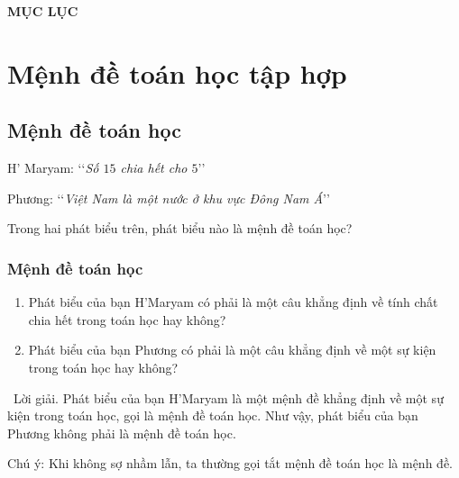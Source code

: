 \documentclass[Main.tex]{subfiles}
\renewcommand{\loigiai}[1]{%
	\par\noindent%
	{\color{dndo}\reflectbox{\Large\WritingHand}\ {\fmmfamily\LARGE Lời giải.}} #1
}
\begin{document}
	\newcommand{\nhanmanh}[2][darkmidnightblue]{{\large\color{#1}\textit{#2}}}
	\setcounter{tocdepth}{1}
	\setcounter{secnumdepth}{3}
	\begin{center}
		\begin{tcolorbox}[enhanced,hbox,
			left=8mm,right=8mm,boxrule=0.55pt,
			bottom=3pt,
			colback=cyan!5,colframe=darkmidnightblue,
			drop lifted shadow=black!50!darkmidnightblue,arc is angular,
			before=\par\vspace*{-1mm},after=\par\bigskip]
			{\Large\bfseries\sffamily\color{darkmidnightblue} MỤC LỤC}
		\end{tcolorbox}
	\end{center}
	
	\vspace*{-0.5cm}
	\makeatletter
	\makeatother
	
	\def\muctieu{Trong chương này, chúng ta tìm hiểu những nội dung sau: mệnh đề toán học, tập hợp và các phép toán trên tập hợp.}
	\chapter{Mệnh đề toán học tập hợp}
	
	\section{Mệnh đề toán học}
	\dongkevd
	\noindent
	H' Maryam: \lq\lq\textit{Số $15$ chia hết cho $5$}\rq\rq
	
	\noindent
	Phương: \lq\lq\textit{Việt Nam là một nước ở khu vực Đông Nam Á}\rq\rq
	
	\begin{cauhoikd}
		Trong hai phát biểu trên, phát biểu nào là mệnh đề toán học?
	\end{cauhoikd}
	
	\subsection{Mệnh đề toán học}
	
	\begin{hd}
		\begin{enumerate}
			\item Phát biểu của bạn H'Maryam có phải là một câu khẳng định về tính chất chia hết trong toán học hay không?
			\item Phát biểu của bạn Phương có phải là một câu khẳng định về một sự kiện trong toán học hay không?
		\end{enumerate}
		\loigiai{Phát biểu của bạn H'Maryam là một mệnh đề khẳng định về một sự kiện trong toán học, gọi là mệnh đề toán học.
			Như vậy, phát biểu của bạn Phương không phải là mệnh đề toán học.
		}
	\end{hd}
	\begin{luuy}
		Chú ý: Khi không sợ nhầm lẫn, ta thường gọi tắt mệnh đề toán học là mệnh đề.
	\end{luuy}
	
\end{document}

